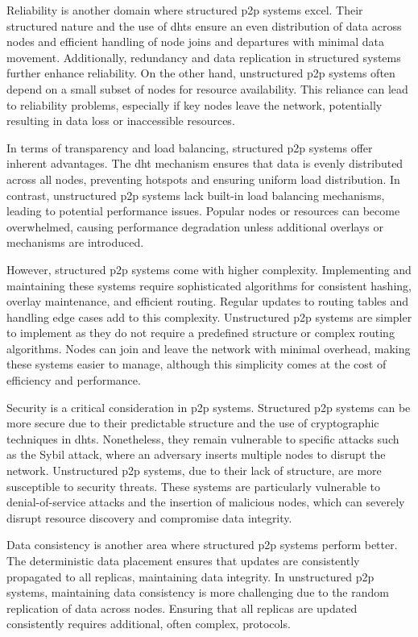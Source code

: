 Reliability is another domain where structured \gls{p2p} systems excel.
Their structured nature and the use of \glspl{dht} ensure an even distribution of data across nodes and efficient handling of node joins and departures with minimal data movement.
Additionally, redundancy and data replication in structured systems further enhance reliability.
On the other hand, unstructured \gls{p2p} systems often depend on a small subset of nodes for resource availability.
This reliance can lead to reliability problems, especially if key nodes leave the network, potentially resulting in data loss or inaccessible resources.

In terms of transparency and load balancing, structured \gls{p2p} systems offer inherent advantages.
The \gls{dht} mechanism ensures that data is evenly distributed across all nodes, preventing hotspots and ensuring uniform load distribution.
In contrast, unstructured \gls{p2p} systems lack built-in load balancing mechanisms, leading to potential performance issues.
Popular nodes or resources can become overwhelmed, causing performance degradation unless additional overlays or mechanisms are introduced.

However, structured \gls{p2p} systems come with higher complexity.
Implementing and maintaining these systems require sophisticated algorithms for consistent hashing, overlay maintenance, and efficient routing.
Regular updates to routing tables and handling edge cases add to this complexity.
Unstructured \gls{p2p} systems are simpler to implement as they do not require a predefined structure or complex routing algorithms.
Nodes can join and leave the network with minimal overhead, making these systems easier to manage, although this simplicity comes at the cost of efficiency and performance.

Security is a critical consideration in \gls{p2p} systems.
Structured \gls{p2p} systems can be more secure due to their predictable structure and the use of cryptographic techniques in \glspl{dht}.
Nonetheless, they remain vulnerable to specific attacks such as the Sybil attack, where an adversary inserts multiple nodes to disrupt the network.
Unstructured \gls{p2p} systems, due to their lack of structure, are more susceptible to security threats.
These systems are particularly vulnerable to denial-of-service attacks and the insertion of malicious nodes, which can severely disrupt resource discovery and compromise data integrity.

Data consistency is another area where structured \gls{p2p} systems perform better.
The deterministic data placement ensures that updates are consistently propagated to all replicas, maintaining data integrity.
In unstructured \gls{p2p} systems, maintaining data consistency is more challenging due to the random replication of data across nodes.
Ensuring that all replicas are updated consistently requires additional, often complex, protocols.


